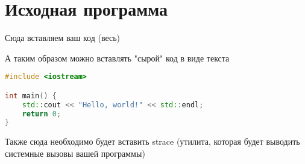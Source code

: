 \section{Исходная программа}

Сюда вставляем ваш код (весь)

\begin{center}

\end{center}

А таким образом можно вставлять "сырой" код в виде текста
\begin{lstlisting}[language=C++]
#include <iostream>

int main() {
    std::cout << "Hello, world!" << std::endl;
    return 0;
}
\end{lstlisting}

Также сюда необходимо будет вставить strace (утилита, которая будет выводить системные вызовы вашей программы)